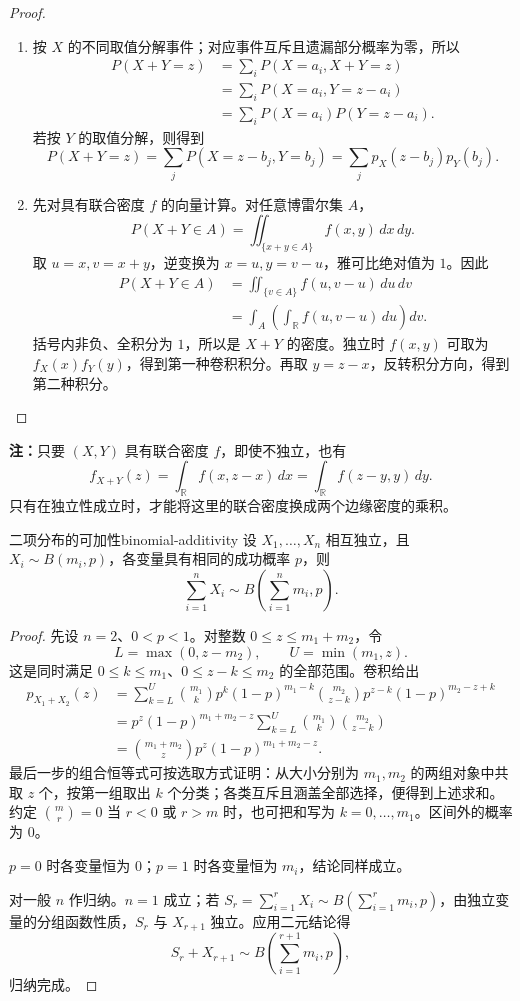 \begin{proof}
\begin{enumerate}
\item 按 $X$ 的不同取值分解事件；对应事件互斥且遗漏部分概率为零，所以
\begin{align*}
P(X+Y=z)
&=\sum_iP(X=a_i,X+Y=z)\\
&=\sum_iP(X=a_i,Y=z-a_i)\\
&=\sum_iP(X=a_i)P(Y=z-a_i).
\end{align*}
若按 $Y$ 的取值分解，则得到
\[
P(X+Y=z)=\sum_jP(X=z-b_j,Y=b_j)
=\sum_jp_X(z-b_j)p_Y(b_j).
\]
\item 先对具有联合密度 $f$ 的向量计算。对任意博雷尔集 $A$，
\[
P(X+Y\in A)=\iint_{\{x+y\in A\}}f(x,y)\,dx\,dy.
\]
取 $u=x,v=x+y$，逆变换为 $x=u,y=v-u$，雅可比绝对值为 $1$。因此
\begin{align*}
P(X+Y\in A)
&=\iint_{\{v\in A\}}f(u,v-u)\,du\,dv\\
&=\int_A\left(\int_{\mathbb R}f(u,v-u)\,du\right)dv.
\end{align*}
括号内非负、全积分为 $1$，所以是 $X+Y$ 的密度。独立时 $f(x,y)$ 可取为 $f_X(x)f_Y(y)$，得到第一种卷积积分。再取 $y=z-x$，反转积分方向，得到第二种积分。
\end{enumerate}
\end{proof}

\textbf{注：}\quad 只要 $(X,Y)$ 具有联合密度 $f$，即使不独立，也有
\[
f_{X+Y}(z)=\int_{\mathbb R}f(x,z-x)\,dx
=\int_{\mathbb R}f(z-y,y)\,dy.
\]
只有在独立性成立时，才能将这里的联合密度换成两个边缘密度的乘积。

\begin{mytheorem}{二项分布的可加性}{binomial-additivity}
设 $X_1,\ldots,X_n$ 相互独立，且 $X_i\sim B(m_i,p)$，各变量具有相同的成功概率 $p$，则
\[
\sum_{i=1}^nX_i\sim B\left(\sum_{i=1}^nm_i,p\right).
\]
\end{mytheorem}
\begin{proof}
先设 $n=2$、$0<p<1$。对整数 $0\leq z\leq m_1+m_2$，令
\[
L=\max(0,z-m_2),\qquad U=\min(m_1,z).
\]
这是同时满足 $0\leq k\leq m_1$、$0\leq z-k\leq m_2$ 的全部范围。卷积给出
\begin{align*}
p_{X_1+X_2}(z)
&=\sum_{k=L}^U\binom{m_1}k p^k(1-p)^{m_1-k}
 \binom{m_2}{z-k}p^{z-k}(1-p)^{m_2-z+k}\\
&=p^z(1-p)^{m_1+m_2-z}
  \sum_{k=L}^U\binom{m_1}k\binom{m_2}{z-k}\\
&=\binom{m_1+m_2}z p^z(1-p)^{m_1+m_2-z}.
\end{align*}
最后一步的组合恒等式可按选取方式证明：从大小分别为 $m_1,m_2$ 的两组对象中共取 $z$ 个，按第一组取出 $k$ 个分类；各类互斥且涵盖全部选择，便得到上述求和。约定 $\binom mr=0$ 当 $r<0$ 或 $r>m$ 时，也可把和写为 $k=0,\ldots,m_1$。区间外的概率为 $0$。

$p=0$ 时各变量恒为 $0$；$p=1$ 时各变量恒为 $m_i$，结论同样成立。

对一般 $n$ 作归纳。$n=1$ 成立；若 $S_r=\sum_{i=1}^rX_i\sim B(\sum_{i=1}^rm_i,p)$，由独立变量的分组函数性质，$S_r$ 与 $X_{r+1}$ 独立。应用二元结论得
\[
S_r+X_{r+1}\sim B\left(\sum_{i=1}^{r+1}m_i,p\right),
\]
归纳完成。
\end{proof}

